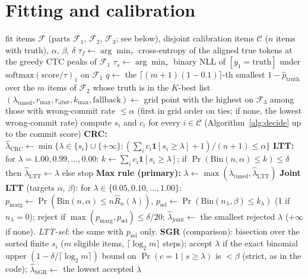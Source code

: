 \section{Fitting and calibration}
\label{app:algorithms}

\begin{algorithm}[H]
\caption{Fitting and calibration of the commit threshold}
\label{alg:calibrate}
\small
\begin{algorithmic}[1]
\Require fit items $\mathcal{F}$ (parts $\mathcal{F}_1$, $\mathcal{F}_2$, $\mathcal{F}_3$; see below), disjoint calibration items $\mathcal{C}$ ($n$ items with truth), $\alpha$, $\beta$, $\delta$
\State $\tau_f \gets \arg\min_\tau$ cross-entropy of the aligned true tokens at the greedy CTC peaks of $\mathcal{F}_1$ 
\State $\tau_s \gets \arg\min_\tau$ binary NLL of $[y_1 = \text{truth}]$ under $\mathrm{softmax}(\text{score}/\tau)_1$ on $\mathcal{F}_1$
\State $q \gets$ the $\lceil (m+1)(1 - 0.1)\rceil$-th smallest $1 - \hat p_{\text{truth}}$ over the $m$ items of $\mathcal{F}_2$ whose truth is in the $K$-best list
\State $(\lambda_{\mathrm{tuned}}, r_{\max}, r_{\mathrm{abst}}, k_{\max}, \text{fallback}) \gets$ grid point with the highest \ewpm{} on $\mathcal{F}_3$ among those with wrong-commit rate $\le \alpha$ (first in grid order on ties; if none, the lowest wrong-commit rate)
\State compute $s_i$ and $c_i$ for every $i \in \mathcal{C}$ (Algorithm~\ref{alg:decide} up to the commit score)
\State \textbf{CRC:} $\hat\lambda_{\mathrm{CRC}} \gets \min\{\lambda \in \{s_i\} \cup \{+\infty\} : (\sum_i c_i \mathbf{1}[s_i \ge \lambda] + 1)/(n+1) \le \alpha\}$
\State \textbf{LTT:} for $\lambda = 1.00, 0.99, \ldots, 0.00$: $k \gets \sum_i c_i \mathbf{1}[s_i \ge \lambda]$; if $\Pr(\mathrm{Bin}(n,\alpha) \le k) \le \delta$ then $\hat\lambda_{\mathrm{LTT}} \gets \lambda$ else stop 
\State \textbf{Max rule (primary):} $\lambda \gets \max(\lambda_{\mathrm{tuned}}, \hat\lambda_{\mathrm{LTT}})$ 
\State \textbf{Joint LTT} (targets $\alpha$, $\beta$): for $\lambda \in \{0.05, 0.10, \ldots, 1.00\}$: $p_{\mathrm{marg}} \gets \Pr(\mathrm{Bin}(n,\alpha) \le n\hat R_n(\lambda))$, $p_{\mathrm{sel}} \gets \Pr(\mathrm{Bin}(n_\lambda,\beta) \le k_\lambda)$ (1 if $n_\lambda = 0$); reject if $\max(p_{\mathrm{marg}}, p_{\mathrm{sel}}) \le \delta/20$; $\hat\lambda_{\mathrm{joint}} \gets$ the smallest rejected $\lambda$ ($+\infty$ if none). \emph{LTT-sel}: the same with $p_{\mathrm{sel}}$ only.
\State \textbf{SGR} (comparison): bisection over the sorted finite $s_i$ ($m$ eligible items, $\lceil\log_2 m\rceil$ steps); accept $\lambda$ if the exact binomial upper $(1 - \delta/\lceil\log_2 m\rceil)$ bound on $\Pr(c = 1 \mid s \ge \lambda)$ is $< \beta$ (strict, as in the code); $\hat\lambda_{\mathrm{SGR}} \gets$ the lowest accepted $\lambda$
\end{algorithmic}
\end{algorithm}


